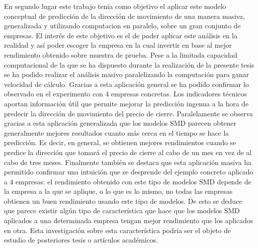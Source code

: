 \documentclass[]{DissertateUSU}
\begin{document}
\noindent En segundo lugar este trabajo tenía como objetivo el aplicar
este modelo conceptual de predicción de la dirección de movimiento de
una manera masiva, generalizada y utilizando computacion en paralelo,
sobre un gran conjunto de empresas. El interés de este objetivo es el de
poder aplicar este análisis en la realidad y así poder escoger la
empresa en la cual invertir en base al mejor rendimiento obtenido sobre
muestra de prueba. Pese a la limitada capacidad computacional de la que
se ha dispuesto durante la realización de la presente tesis se ha podido
realizar el análisis masivo paralelizando la computación para ganar
velocidad de cálculo. Gracias a esta aplicación general se ha podido
confirmar lo observado en el experimento con 4 empresas concretas. Los
indicadores técnicos aportan información útil que permite mejorar la
predicción ingenua a la hora de predecir la dirección de movimiento del
precio de cierre. Paralelamente se observa gracias a esta aplicación
generalizada que los modelos SMD parecen obtener generalmente mejores
resultados cuanto más cerca en el tiempo se hace la predicción. Es
decir, en general, se obtienen mejores rendimientos cuando se predice la
dirección que tomará el precio de cierre al cabo de un mes en vez de al
cabo de tres meses. Finalmente también se destaca que esta aplicación
masiva ha permitido confirmar una intuición que se desprende del ejemplo
concreto aplicado a 4 empresas: el rendimiento obtenido con este tipo de
modelos SMD depende de la empresa a la que se aplique, o lo que es lo
mismo, no todas las empresas obtienen un buen rendimiento usando este
tipo de modelos. De esto se deduce que parece existir algún tipo de
característica que hace que los modelos SMD aplicados a una determinada
empresa tengan mejor rendimiento que los aplicados en otra. Esta
investigación sobre esta característica podría ser el objeto de estudio
de posteriores tesis o artículos académicos.
\end{document}
